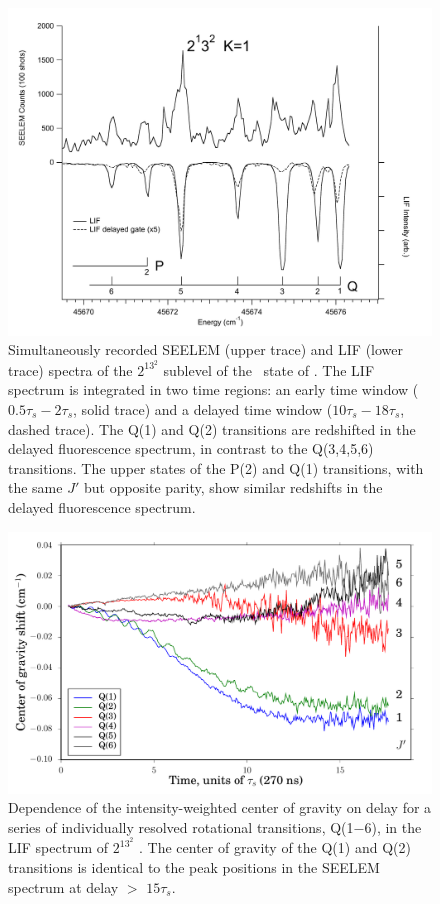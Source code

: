 \begin{figure}
  \caption{Simultaneously recorded SEELEM (upper trace) and LIF (lower
    trace) spectra of the $2^13^2$  sublevel of the \astate\
    state of .  The LIF spectrum is integrated in two time
    regions: an early time window ($0.5\tau_s-2\tau_s$, solid trace)
    and a delayed time window ($10\tau_s-18\tau_s$, dashed trace).
    The Q(1) and Q(2) transitions are redshifted in the delayed
    fluorescence spectrum, in contrast to the Q(3,4,5,6) transitions.
    The upper states of the P(2) and Q(1) transitions, with the same
    $J'$ but opposite parity, show similar redshifts in the delayed
    fluorescence spectrum.}
  \label{fig:spectrum-2132}
  \centering
  \vspace{1cm}
  \includegraphics[width=7in,angle=90]{spectrum-2132-q6q1.pdf}
\end{figure}

\begin{figure}
  \caption{Dependence of the intensity-weighted center of gravity on
    delay for a series of individually resolved rotational
    transitions, Q(1$-$6), in the LIF spectrum of $2^13^2$ .
    The center of gravity of the Q(1) and Q(2) transitions is
    identical to the peak positions in the SEELEM spectrum at
    delay $>$ $15\tau_s$.}
  \label{fig:2132-q123456-cog-delay}
  \centering
  \vspace{1cm}
  \includegraphics[width=6in]{2132-q123456-cog-delay.pdf}
\end{figure}

